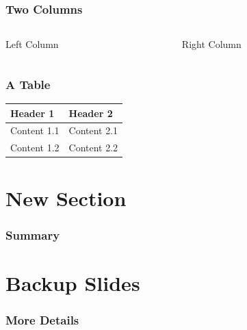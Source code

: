 \documentclass[final, hyperref={pdfpagemode=FullScreen}, aspectratio=169]{beamer}
\begin{document}
\begin{frame}
  \frametitle{Two Columns}
  \footnotesize

  \begin{columns}
    \begin{column}{0.5\textwidth}
      Left Column
    \end{column}
    \begin{column}{0.5\textwidth}
      Right Column
    \end{column}
  \end{columns}
\end{frame}


\begin{frame}
  \frametitle{A Table}

  \begin{tabular}{ll}\toprule
    \bf{Header 1}		& \bf{Header 2}\\\midrule
    Content 1.1		& Content 2.1\\
    Content 1.2		& Content 2.2\\
    \bottomrule
  \end{tabular}
\end{frame}


\section{New Section}


\begin{frame}
  \frametitle{Summary}

\end{frame}


\appendix
\beginbackup
\section{Backup Slides}

\begin{frame}
  \frametitle{More Details}
\end{frame}

\backupend
\end{document}
